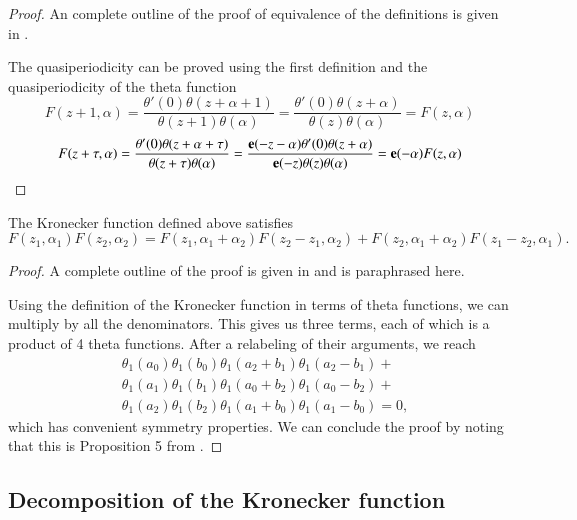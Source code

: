 \begin{proof}
    An complete outline of the proof of equivalence of the definitions is given in \cite{BL13}.

    The quasiperiodicity can be proved using the first definition and the quasiperiodicity of the theta function
    \begin{equation}
        F(z+1,\alpha) = \frac{\theta'(0)\theta(z+\alpha+1)}{\theta(z+1)\theta(\alpha)} = \frac{\theta'(0)\theta(z+\alpha)}{\theta(z)\theta(\alpha)} = F(z,\alpha)
    \end{equation}
    \begin{equation}
        F(z+\tau,\alpha) = \frac{\theta'(0)\theta(z+\alpha+\tau)}{\theta(z+\tau)\theta(\alpha)} = \frac{\mathbf{e}(-z-\alpha)\theta'(0)\theta(z+\alpha)}{\mathbf{e}(-z)\theta(z)\theta(\alpha)} = \mathbf{e}(-\alpha) F(z,\alpha)
    \end{equation}
\end{proof}

\begin{lemma}
    The Kronecker function defined above satisfies
    \begin{equation}\label{eqnB12:FayKronecker}
        {F}(z_1,\alpha_1){F}(z_2,\alpha_2) = {F}(z_1,\alpha_1+\alpha_2){F}(z_2-z_1,\alpha_2) + {F}(z_2,\alpha_1+\alpha_2){F}(z_1-z_2,\alpha_1).
    \end{equation}
\end{lemma}

\begin{proof}
    A complete outline of the proof is given in \cite{Mat19} and is paraphrased here.

    Using the definition of the Kronecker function in terms of theta functions, we can multiply by all the denominators.
    This gives us three terms, each of which is a product of 4 theta functions. After a relabeling of their arguments, we reach
    \begin{align}
        & \theta_1(a_0)\theta_1(b_0)\theta_1(a_2+b_1)\theta_1(a_2-b_1) + \\
        & \theta_1(a_1)\theta_1(b_1)\theta_1(a_0+b_2)\theta_1(a_0-b_2) + \\
        & \theta_1(a_2)\theta_1(b_2)\theta_1(a_1+b_0)\theta_1(a_1-b_0) = 0,
    \end{align}
    which has convenient symmetry properties. We can conclude the proof by noting that this is Proposition 5 from \cite{Zagier1991}.
\end{proof}

\subsection{Decomposition of the Kronecker function}

